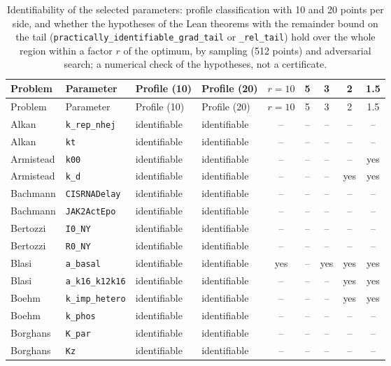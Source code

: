 \begingroup\scriptsize\setlength{\tabcolsep}{3pt}
\begin{longtable}{@{}llllccccc@{}}
\caption{Identifiability of the selected parameters: profile classification with 10 and 20 points per side, and whether the hypotheses of the Lean theorems with the remainder bound on the tail (\texttt{practically\_identifiable\_grad\_tail} or \texttt{\_rel\_tail}) hold over the whole region within a factor $r$ of the optimum, by sampling (512 points) and adversarial search; a numerical check of the hypotheses, not a certificate.}\label{tab:identifregion}\\
\toprule
Problem & Parameter & Profile (10) & Profile (20) & $r=10$ & 5 & 3 & 2 & 1.5 \\
\midrule
\endfirsthead
\toprule
Problem & Parameter & Profile (10) & Profile (20) & $r=10$ & 5 & 3 & 2 & 1.5 \\
\midrule
\endhead
Alkan & \texttt{k\_rep\_nhej} & identifiable & identifiable & -- & -- & -- & -- & -- \\
Alkan & \texttt{kt} & identifiable & identifiable & -- & -- & -- & -- & -- \\
Armistead & \texttt{k00} & identifiable & identifiable & -- & -- & -- & -- & yes \\
Armistead & \texttt{k\_d} & identifiable & identifiable & -- & -- & -- & yes & yes \\
Bachmann & \texttt{CISRNADelay} & identifiable & identifiable & -- & -- & -- & -- & -- \\
Bachmann & \texttt{JAK2ActEpo} & identifiable & identifiable & -- & -- & -- & -- & -- \\
Bertozzi & \texttt{I0\_NY} & identifiable & identifiable & -- & -- & -- & -- & -- \\
Bertozzi & \texttt{R0\_NY} & identifiable & identifiable & -- & -- & -- & -- & -- \\
Blasi & \texttt{a\_basal} & identifiable & identifiable & yes & -- & yes & yes & yes \\
Blasi & \texttt{a\_k16\_k12k16} & identifiable & identifiable & -- & -- & -- & yes & yes \\
Boehm & \texttt{k\_imp\_hetero} & identifiable & identifiable & -- & -- & -- & yes & yes \\
Boehm & \texttt{k\_phos} & identifiable & identifiable & -- & -- & -- & -- & -- \\
Borghans & \texttt{K\_par} & identifiable & identifiable & -- & -- & -- & -- & -- \\
Borghans & \texttt{Kz} & identifiable & identifiable & -- & -- & -- & -- & -- \\

\end{longtable}
